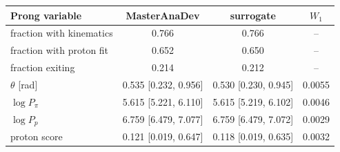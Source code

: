 \begin{tabular}{lccc}
\toprule
Prong variable & MasterAnaDev & surrogate & $W_1$ \\
\midrule
fraction with kinematics & 0.766 & 0.766 & -- \\
fraction with proton fit & 0.652 & 0.650 & -- \\
fraction exiting & 0.214 & 0.212 & -- \\
$\theta$ [rad] & 0.535 [0.232, 0.956] & 0.530 [0.230, 0.945] & 0.0055 \\
$\log P_\pi$ & 5.615 [5.221, 6.110] & 5.615 [5.219, 6.102] & 0.0046 \\
$\log P_p$ & 6.759 [6.479, 7.077] & 6.759 [6.479, 7.072] & 0.0029 \\
proton score & 0.121 [0.019, 0.647] & 0.118 [0.019, 0.635] & 0.0032 \\
\bottomrule
\end{tabular}
